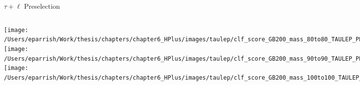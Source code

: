 \documentclass[aspectratio=169,xcolor=table]{beamer}
\begin{document}
    \begin{frame}[t]{$\tau+\ell$ Preselection}
      \begin{columns}[t]
          \texttt{[image: /Users/eparrish/Work/thesis/chapters/chapter6\_HPlus/images/taulep/clf\_score\_GB200\_mass\_80to80\_TAULEP\_PRESEL.png]}
          \texttt{[image: /Users/eparrish/Work/thesis/chapters/chapter6\_HPlus/images/taulep/clf\_score\_GB200\_mass\_90to90\_TAULEP\_PRESEL.png]}
          \texttt{[image: /Users/eparrish/Work/thesis/chapters/chapter6\_HPlus/images/taulep/clf\_score\_GB200\_mass\_100to100\_TAULEP\_PRESEL.png]}

          \texttt{[image: /Users/eparrish/Work/thesis/chapters/chapter6\_HPlus/images/taulep/clf\_score\_GB200\_mass\_110to110\_TAULEP\_PRESEL.png]}
          \texttt{[image: /Users/eparrish/Work/thesis/chapters/chapter6\_HPlus/images/taulep/clf\_score\_GB200\_mass\_120to120\_TAULEP\_PRESEL.png]}
          \texttt{[image: /Users/eparrish/Work/thesis/chapters/chapter6\_HPlus/images/taulep/clf\_score\_GB200\_mass\_130to130\_TAULEP\_PRESEL.png]}
          \texttt{[image: /Users/eparrish/Work/thesis/chapters/chapter6\_HPlus/images/taulep/clf\_score\_GB200\_mass\_140to140\_TAULEP\_PRESEL.png]}
          \texttt{[image: /Users/eparrish/Work/thesis/chapters/chapter6\_HPlus/images/taulep/clf\_score\_GB200\_mass\_150to150\_TAULEP\_PRESEL.png]}
          \texttt{[image: /Users/eparrish/Work/thesis/chapters/chapter6\_HPlus/images/taulep/clf\_score\_GB200\_mass\_160to160\_TAULEP\_PRESEL.png]}

          \texttt{[image: /Users/eparrish/Work/thesis/chapters/chapter6\_HPlus/images/taulep/clf\_score\_GB200\_mass\_170to170\_TAULEP\_PRESEL.png]}
          \texttt{[image: /Users/eparrish/Work/thesis/chapters/chapter6\_HPlus/images/taulep/clf\_score\_GB200\_mass\_180to180\_TAULEP\_PRESEL.png]}
          \texttt{[image: /Users/eparrish/Work/thesis/chapters/chapter6\_HPlus/images/taulep/clf\_score\_GB200\_mass\_190to190\_TAULEP\_PRESEL.png]}

      \end{columns}
    \end{frame}
\end{document}
